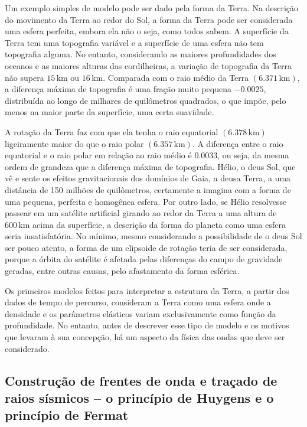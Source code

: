\documentclass[]{book}
\theoremstyle{definition}
\theoremstyle{definition}
\theoremstyle{definition}
\theoremstyle{remark}
\begin{document}
Um exemplo simples de modelo pode ser dado pela forma da Terra. Na descrição do movimento da Terra ao redor do Sol, a forma da Terra pode ser considerada uma esfera perfeita, embora ela não o seja, como todos sabem. A superfície da Terra tem uma topografia variável e a superfície de uma esfera não tem topografia alguma. No entanto, considerando as maiores profundidades dos oceanos e as maiores alturas das cordilheiras, a variação de topografia da Terra não supera \(15\,\mathrm{km}\) ou \(16\,\mathrm{km}\). Comparada com o raio médio da Terra \((6.371\,\mathrm{km})\), a diferença máxima de topografia é uma fração muito pequena \(-0.0025\), distribuída ao longo de milhares de quilômetros quadrados, o que impõe, pelo menos na maior parte da superfície, uma certa suavidade.

A rotação da Terra faz com que ela tenha o raio equatorial \((6.378\,\mathrm{km})\) ligeiramente maior do que o raio polar \((6.357\,\mathrm{km})\). A diferença entre o raio equatorial e o raio polar em relação ao raio médio é \(0.0033\), ou seja, da mesma ordem de grandeza que a diferença máxima de topografia. Hélio, o deus Sol, que vê e sente os efeitos gravitacionais dos domínios de Gaia, a deusa Terra, a uma distância de 150 milhões de quilômetros, certamente a imagina com a forma de uma pequena, perfeita e homogênea esfera. Por outro lado, se Hélio resolvesse passear em um satélite artificial girando ao redor da Terra a uma altura de \(600\,\mathrm{km}\) acima da superfície, a descrição da forma do planeta como uma esfera seria insatisfatória. No mínimo, mesmo considerando a possibilidade de o deus Sol ser pouco atento, a forma de um elipsoide de rotação teria de ser considerada, porque a órbita do satélite é afetada pelas diferenças do campo de gravidade geradas, entre outras causas, pelo afastamento da forma esférica.

Os primeiros modelos feitos para interpretar a estrutura da Terra, a partir dos dados de tempo de percurso, consideram a Terra como uma esfera onde a densidade e os parâmetros elásticos variam exclusivamente como função da profundidade. No entanto, antes de descrever esse tipo de modelo e os motivos que levaram à sua concepção, há um aspecto da física das ondas que deve ser considerado.

\hypertarget{construcao-de-frentes-de-onda-e-tracado-de-raios-sismicos-o-principio-de-huygens-e-o-principio-de-fermat}{%
\subsection{Construção de frentes de onda e traçado de raios sísmicos -- o princípio de Huygens e o princípio de Fermat}\label{construcao-de-frentes-de-onda-e-tracado-de-raios-sismicos-o-principio-de-huygens-e-o-principio-de-fermat}}
\end{document}
